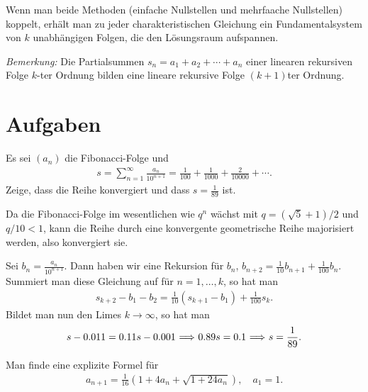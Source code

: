 \documentclass[11pt,a4paper]{article}
\begin{document}
Wenn man beide Methoden (einfache Nullstellen und mehrfaache Nullstellen)
koppelt, erhält man zu jeder charakteristischen Gleichung ein Fundamentalsystem
von $k$ unabhängigen Folgen, die den Lösungsraum aufspannen.

\emph{Bemerkung:} Die Partialsummen $s_n=a_1 +a_2 +\cdots +a_n$ einer linearen
rekursiven Folge $k$-ter Ordnung bilden eine lineare rekursive Folge $(k+1)$ter
Ordnung.

\section{Aufgaben}

\begin{aufgabe} %
Es sei $(a_n)$ die Fibonacci-Folge und 
\begin{gather*} 
  s=\sum_{n=1}^\infty \frac{a_{n}}{10^{n+1}} =\frac{1}{100} +\frac{1}{1000}
  +\frac{2}{10000} +\cdots .
\end{gather*}
Zeige, dass die Reihe konvergiert und dass $s=\frac{1}{89}$ ist.
\end{aufgabe}

\begin{beweis}
Da die Fibonacci-Folge im wesentlichen wie $q^n$ wächst mit $q=(\sqrt{5} +1)/2$
und $q/10 <1$, kann die Reihe durch eine konvergente geometrische Reihe
majorisiert werden, also konvergiert sie.

Sei $b_n=\frac{a_n}{10^{n+1}}$. Dann  haben wir eine Rekursion für $b_n$,
$b_{n+2} =\frac{1}{10} b_{n+1} +\frac{1}{100} b_n$.
Summiert man diese Gleichung auf für $n=1,\dots , k$, so hat man
\begin{gather*}
s_{k+2} - b_1 -b_2 = \frac{1}{10}( s_{k+1} -b_1) + \frac{1}{100} s_k.
\end{gather*}
Bildet man nun den Limes $k\to \infty $, so hat man
\begin{gather*}
s-0.011 =0.11 s -0.001 {\,\,\Longrightarrow}\,\, 0.89s=0.1{\,\,\Longrightarrow}\,\, s=\frac{1}{89}.
\end{gather*}
\end{beweis}

\begin{aufgabe} %
Man finde eine explizite Formel für
\begin{gather*}
a_{n+1}= \frac{1}{16} \left( 1+4 a_n + \sqrt{1 +24 a_n}\right), \quad a_1=1.
\end{gather*}
\end{aufgabe}
\end{document}
